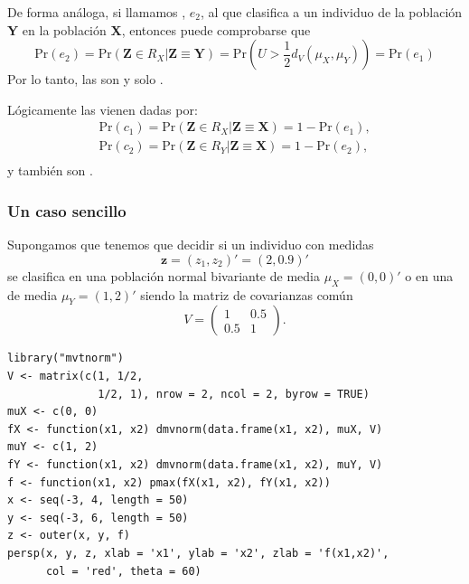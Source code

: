 De forma análoga, si llamamos , $e_2$, al que clasifica a un individuo de la población \textbf{Y} en la población \textbf{X}, entonces puede comprobarse que \[ \mathrm{Pr}(e_2)=\mathrm{Pr}(\mathbf{Z}\in R_X|\mathbf{Z\equiv Y})=\mathrm{Pr}\left(U>\dfrac{1}{2}d_V(\mu_X,\mu_Y)\right)=\mathrm{Pr}(e_1) \]
Por lo tanto, las  son  y solo .

Lógicamente las  vienen dadas por: \[ \begin{array}{l}
\mathrm{Pr}(c_1)=\mathrm{Pr}(\mathbf{Z}\in R_X|\mathbf{Z\equiv X})=1-\mathrm{Pr}(e_1),\\
\mathrm{Pr}(c_2)=\mathrm{Pr}(\mathbf{Z}\in R_Y|\mathbf{Z\equiv X})=1-\mathrm{Pr}(e_2),\\
\end{array} \] y también son .

\subsubsection*{Un caso sencillo}

\begin{minipage}{0.35\textwidth}
Supongamos que tenemos que decidir si un individuo con medidas \[ \mathbf{z}=(z_1,z_2)'=(2,0.9)' \]se clasifica en una población normal bivariante de media $\mu_X=(0,0)'$ o en una de media $\mu_Y=(1,2)'$ siendo la matriz de covarianzas común \[ V=\begin{pmatrix}
1 & 0.5\\
0.5 & 1
\end{pmatrix}. \]
\end{minipage}\qquad\begin{minipage}{0.6\textwidth}
\begin{lstlisting}[basicstyle=\ttfamily\footnotesize]
library("mvtnorm")
V <- matrix(c(1, 1/2,
              1/2, 1), nrow = 2, ncol = 2, byrow = TRUE)
muX <- c(0, 0)
fX <- function(x1, x2) dmvnorm(data.frame(x1, x2), muX, V)
muY <- c(1, 2)
fY <- function(x1, x2) dmvnorm(data.frame(x1, x2), muY, V)
f <- function(x1, x2) pmax(fX(x1, x2), fY(x1, x2))
x <- seq(-3, 4, length = 50)
y <- seq(-3, 6, length = 50)
z <- outer(x, y, f)
persp(x, y, z, xlab = 'x1', ylab = 'x2', zlab = 'f(x1,x2)', 
      col = 'red', theta = 60)
\end{lstlisting}
\end{minipage}

